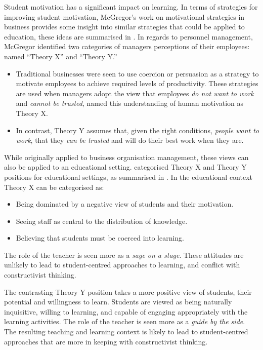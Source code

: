 %
%


Student motivation has a significant impact on learning. In terms of strategies for improving student motivation, McGregor's work on motivational strategies in business \cite{McGregor:1960} provides some insight into similar strategies that could be applied to education, these ideas are summarised in .  In regards to personnel management, McGregor identified two categories of managers perceptions of their employees: named ``Theory X'' and ``Theory Y.'' 

\begin{itemize}[noitemsep,nolistsep]
	\item Traditional businesses were seen to use coercion or persuasion as a strategy to motivate employees to achieve required levels of productivity. These strategies are used when managers adopt the view that employees \emph{do not want to work} and \emph{cannot be trusted}, \citet{McGregor:1960} named this understanding of human motivation as Theory X. 
	\item In contrast, Theory Y assumes that, given the right conditions, \emph{people want to work}, that they \emph{can be trusted} and will do their best work when they are.
\end{itemize}


While originally applied to business organisation management, these views can also be applied to an educational setting. \citet{Markwell:2004} categorised Theory X and Theory Y positions for educational settings, as summarised in . In the educational context Theory X can be categorised as:

\begin{itemize}[noitemsep,nolistsep]
	\item Being dominated by a negative view of students and their motivation. 
	\item Seeing staff as central to the distribution of knowledge.
	\item Believing that students must be coerced into learning. 
\end{itemize}

The role of the teacher is seen more as a \emph{sage on a stage}. These attitudes are unlikely to lead to student-centred approaches to learning, and conflict with constructivist thinking.

The contrasting Theory Y position takes a more positive view of students, their potential and willingness to learn. Students are viewed as being naturally inquisitive, willing to learning, and capable of engaging appropriately with the learning activities. The role of the teacher is seen more as a \emph{guide by the side}. The resulting teaching and learning context is likely to lead to student-centred approaches that are more in keeping with constructivist thinking.

